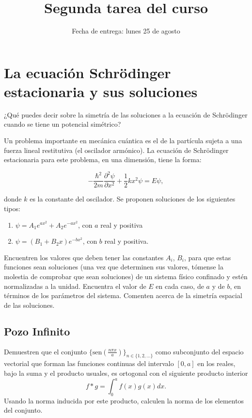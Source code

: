 \documentclass[10pt,letterpaper]{article}
\title{Segunda tarea del curso}
\date{Fecha de entrega: lunes 25 de agosto}
\newenvironment{modenumerate}
  {\enumerate\setupmodenumerate}
  {\endenumerate}
\newif\ifmoditem
\newcommand{\setupmodenumerate}{%
  \global\moditemfalse
  \let\origmakelabel\makelabel
  \def\moditem##1{\global\moditemtrue\def\mesymbol{##1}\item}%
  \def\makelabel##1{%
    \origmakelabel{##1\ifmoditem\rlap{\mesymbol}\fi\enspace}%
    \global\moditemfalse}%
}
\begin{document}
\maketitle

\section{La ecuación Schrödinger estacionaria y sus soluciones}

\begin{modenumerate}
\moditem{} ¿Qué puedes decir sobre la simetría de las soluciones a la ecuación de Schrödinger cuando se tiene un potencial simétrico?
\moditem{} Un problema importante en mecánica cuántica es el de la partícula sujeta a una fuerza lineal restitutiva (el oscilador armónico). La ecuación de Schrödinger estacionaria para este problema, en una dimensión, tiene la forma:

\begin{equation}
-\frac{\hbar^2}{2m}\frac{\partial^2 \psi}{\partial x^2}+\frac{1}{2}kx^2\psi = E\psi ,
\end{equation}

donde $k$ es la constante del oscilador. Se proponen soluciones de los siguientes tipos:
\begin{enumerate}
\renewcommand{\theenumi}{\Alph{enumi}}
\item $\psi = A_1e^{ax^2}+A_2e^{-ax^2}$, con $a$ real y positiva
\item $\psi = \left( B_1+B_2x\right) e^{-bx^2}$, con $b$ real y positiva.
\end{enumerate}

Encuentren los valores que deben tener las constantes $A_i$, $B_i$, para que estas funciones sean soluciones (una vez que determinen sus valores, tómense la molestia de comprobar que sean soluciones) de un sistema físico confinado y estén normalizadas a la unidad. Encuentra el valor de $E$ en cada caso, de $a$ y de $b$, en términos de los parámetros del sistema. Comenten acerca de la simetría espacial de las soluciones.

\subsection{Pozo Infinito}

\moditem{} Demuestren que el conjunto $\{\text{sen}\left(\frac{n\pi x}{a}\right)\}_{n\in\{1,2,...\}}$ como subconjunto del espacio vectorial que forman las funciones continuas del intervalo $\left[0,a\right]$ en los reales, bajo la suma y el producto usuales, es ortogonal con el siguiente producto interior
\begin{equation}f*g=\int_{0}^{a} f(x)g(x)dx.\end{equation}
Usando la norma inducida por este producto, calculen la norma de los elementos del conjunto.


\end{modenumerate}
\end{document}
